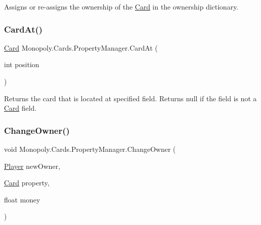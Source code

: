 Assigns or re-\/assigns the ownership of the \mbox{\hyperlink{class_monopoly_1_1_cards_1_1_card}{Card}} in the ownership dictionary. \mbox{\label{class_monopoly_1_1_cards_1_1_property_manager_aea1ea06f71545f89c0eabd0803c87fb2}} 
\subsubsection{\texorpdfstring{Card\+At()}{CardAt()}}
{\footnotesize\ttfamily \mbox{\hyperlink{class_monopoly_1_1_cards_1_1_card}{Card}} Monopoly.\+Cards.\+Property\+Manager.\+Card\+At (\begin{DoxyParamCaption}\item[{int}]{position }\end{DoxyParamCaption})\hspace{0.3cm}{\ttfamily [inline]}}

Returns the card that is located at specified field. Returns null if the field is not a \mbox{\hyperlink{class_monopoly_1_1_cards_1_1_card}{Card}} field. \mbox{\label{class_monopoly_1_1_cards_1_1_property_manager_ab5ff75e9b6f073e75774f6e9c2948d27}} 
\subsubsection{\texorpdfstring{Change\+Owner()}{ChangeOwner()}}
{\footnotesize\ttfamily void Monopoly.\+Cards.\+Property\+Manager.\+Change\+Owner (\begin{DoxyParamCaption}\item[{\mbox{\hyperlink{class_monopoly_1_1_players_1_1_player}{Player}}}]{new\+Owner,  }\item[{\mbox{\hyperlink{class_monopoly_1_1_cards_1_1_card}{Card}}}]{property,  }\item[{float}]{money }\end{DoxyParamCaption})\hspace{0.3cm}{\ttfamily [inline]}}


